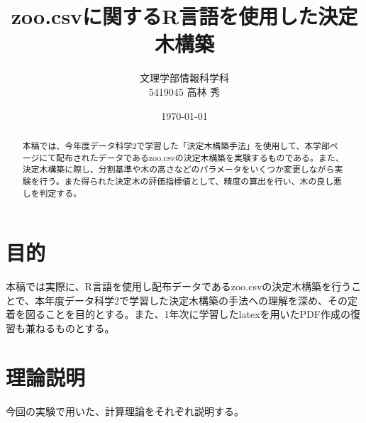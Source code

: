 \documentclass[dvipdfmx]{jsarticle}
\title{zoo.csvに関するR言語を使用した決定木構築}
\author{文理学部情報科学科\\5419045 高林 秀}
\date{\today}
\begin{document}
\maketitle

\begin{abstract}
  本稿では、今年度データ科学2で学習した「決定木構築手法」を使用して、本学部ページにて配布されたデータであるzoo.csvの決定木構築を実験するものである。また、決定木構築に際し、分割基準や木の高さなどのパラメータをいくつか変更しながら実験を行う。また得られた決定木の評価指標値として、精度の算出を行い、木の良し悪しを判定する。
\end{abstract}

\section{目的}
本稿では実際に、R言語を使用し配布データであるzoo.csvの決定木構築を行うことで、本年度データ科学2で学習した決定木構築の手法への理解を深め、その定着を図ることを目的とする。また、1年次に学習したlatexを用いたPDF作成の復習も兼ねるものとする。
\section{理論説明}
今回の実験で用いた、計算理論をそれぞれ説明する。
\end{document}
